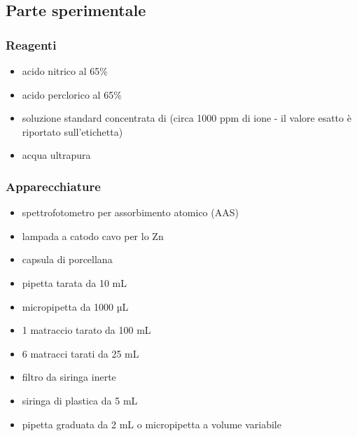 \subsection{Parte sperimentale}

\subsubsection{Reagenti}
\begin{itemize}
\item acido nitrico al 65\%
\item acido perclorico al 65\%
\item soluzione standard concentrata di  (circa 1000 ppm di ione - il valore esatto è riportato sull'etichetta)
\item acqua ultrapura
\end{itemize}

\subsubsection{Apparecchiature}
\begin{itemize}
\item spettrofotometro per assorbimento atomico (AAS)
\item lampada a catodo cavo per lo Zn
\item capsula di porcellana
\item pipetta tarata da 10 mL
\item micropipetta da 1000 µL
\item 1 matraccio tarato da 100 mL
\item 6 matracci tarati da 25 mL
\item filtro da siringa inerte
\item siringa di plastica da 5 mL
\item pipetta graduata da 2 mL o micropipetta a volume variabile
\end{itemize}

